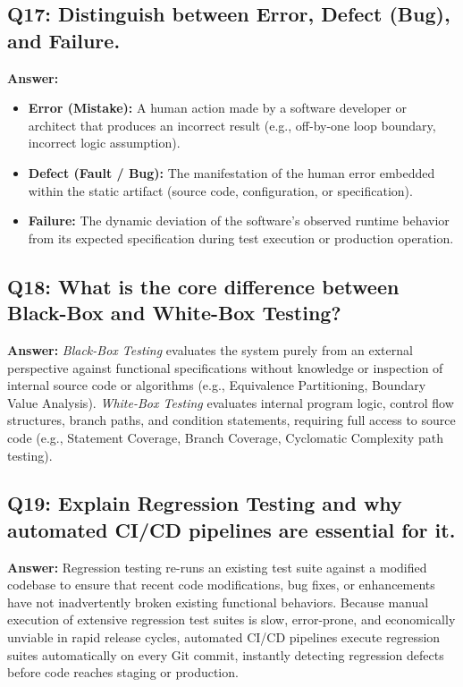 \subsection*{Q17: Distinguish between Error, Defect (Bug), and Failure.}
\textbf{Answer:}
\begin{itemize}
    \item \textbf{Error (Mistake):} A human action made by a software developer or architect that produces an incorrect result (e.g., off-by-one loop boundary, incorrect logic assumption).
    \item \textbf{Defect (Fault / Bug):} The manifestation of the human error embedded within the static artifact (source code, configuration, or specification).
    \item \textbf{Failure:} The dynamic deviation of the software's observed runtime behavior from its expected specification during test execution or production operation.
\end{itemize}

\subsection*{Q18: What is the core difference between Black-Box and White-Box Testing?}
\textbf{Answer:} \textit{Black-Box Testing} evaluates the system purely from an external perspective against functional specifications without knowledge or inspection of internal source code or algorithms (e.g., Equivalence Partitioning, Boundary Value Analysis). \textit{White-Box Testing} evaluates internal program logic, control flow structures, branch paths, and condition statements, requiring full access to source code (e.g., Statement Coverage, Branch Coverage, Cyclomatic Complexity path testing).

\subsection*{Q19: Explain Regression Testing and why automated CI/CD pipelines are essential for it.}
\textbf{Answer:} Regression testing re-runs an existing test suite against a modified codebase to ensure that recent code modifications, bug fixes, or enhancements have not inadvertently broken existing functional behaviors. Because manual execution of extensive regression test suites is slow, error-prone, and economically unviable in rapid release cycles, automated CI/CD pipelines execute regression suites automatically on every Git commit, instantly detecting regression defects before code reaches staging or production.

